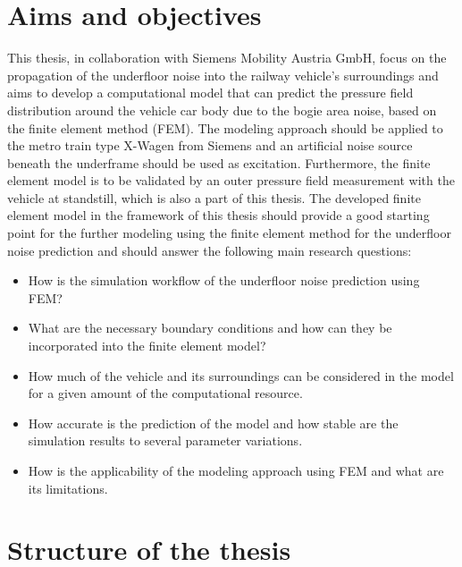 \section{Aims and objectives}

This thesis, in collaboration with Siemens Mobility Austria GmbH, focus on the propagation of the underfloor noise into the railway vehicle's surroundings and aims to develop a computational model that can predict the pressure field distribution around the vehicle car body due to the bogie area noise, based on the finite element method (FEM).
The modeling approach should be applied to the metro train type X-Wagen from Siemens and an artificial noise source beneath the underframe should be used as excitation.
Furthermore, the finite element model is to be validated by an outer pressure field measurement with the vehicle at standstill, which is also a part of this thesis.
The developed finite element model in the framework of this thesis should provide a good starting point for the further modeling using the finite element method for the underfloor noise prediction and should answer the following main research questions:
\begin{itemize}
	\item How is the simulation workflow of the underfloor noise prediction using FEM?
	\item What are the necessary boundary conditions and how can they be incorporated into the finite element model?
	\item How much of the vehicle and its surroundings can be considered in the model for a given amount of the computational resource.
	\item How accurate is the prediction of the model and how stable are the simulation results to several parameter variations.
	\item How is the applicability of the modeling approach using FEM and what are its limitations.
\end{itemize}

\section{Structure of the thesis}

